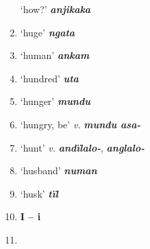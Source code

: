 \begin{enumerate}[noitemsep, label={}, align=left, widest=190, labelsep=1ex,leftmargin=*,itemindent=-10pt]
‘how?’ \textbf{\textit{anjikaka}} \item
‘huge’ \textbf{\textit{ngata}} \item
‘human’ \textbf{\textit{ankam}} \item
‘hundred’ \textbf{\textit{uta}} \item
‘hunger’ \textbf{\textit{mundu}} \item
‘hungry, be’ \textit{v.} \textbf{\textit{mundu asa-}} \item
‘hunt’ \textit{v.} \textbf{\textit{andïlalo-}}, \textbf{\textit{anglalo-}} \item
‘husband’ \textbf{\textit{numan}} \item
‘husk’ \textbf{\textit{tïl}}\\ \item

\noindent \textbf{I – i}\\ \item


\end{enumerate}
